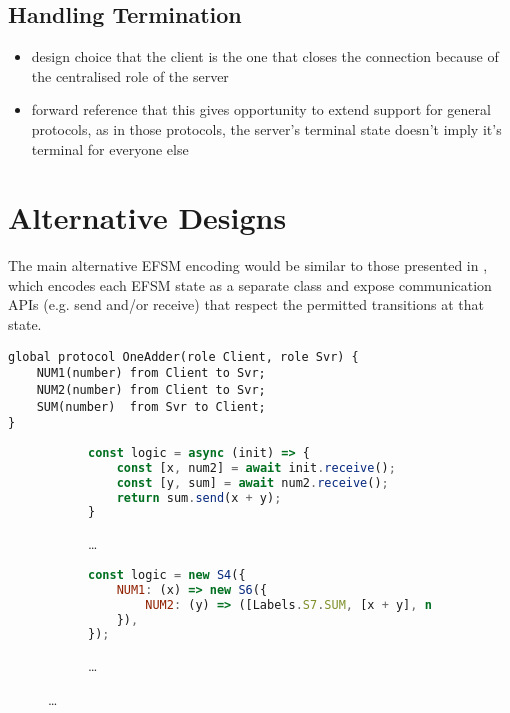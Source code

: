\subsection{Handling Termination}
\begin{itemize}
\item design choice that the client is the one that closes the connection because of the centralised role of the server
\item forward reference that this gives opportunity to extend support for general protocols, as in those protocols, the server's terminal state doesn't imply it's terminal for everyone else
\end{itemize}

\section{Alternative Designs}
\label{section:nodealt}

The main alternative EFSM encoding would be similar to those
presented in \cite{Hybrid2016}, which encodes
each EFSM state as a separate class and expose communication APIs
(e.g. send and/or receive) that respect the permitted transitions at
that state. 

\begin{lstlisting}[language=scribble]
global protocol OneAdder(role Client, role Svr) {
	NUM1(number) from Client to Svr;
	NUM2(number) from Client to Svr;
	SUM(number)  from Svr to Client;
}
\end{lstlisting}

\begin{figure}[!h]
\centering
\begin{subfigure}{\textwidth}
\begin{lstlisting}[language=javascript, tabsize=2]
const logic = async (init) => {
	const [x, num2] = await init.receive();
 	const [y, sum] = await num2.receive();
	return sum.send(x + y);
}
\end{lstlisting}
\caption{\dots}
\end{subfigure}
\hfill
\begin{subfigure}{\textwidth}
\begin{lstlisting}[language=javascript]
const logic = new S4({
	NUM1: (x) => new S6({
		NUM2: (y) => ([Labels.S7.SUM, [x + y], new S5()]),
	}),
});
\end{lstlisting}
\caption{\dots}
\end{subfigure}
\end{figure}

